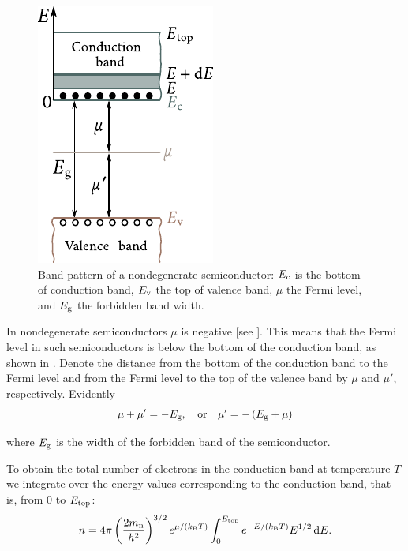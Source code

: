 \begin{figure}[t]
	\begin{center}
		\includegraphics[scale=1]{figures/ch_05/fig_5_17.pdf}
		\caption[]{Band pattern of a nondegenerate semiconductor: $E_{\text{c}}$ is the bottom of conduction band, $E_{\text{v}}$ the top of valence band, $\mu$ the Fermi level, and $E_{\text{g}}$ the forbidden band width.}
		\label{fig:5_17}
	\end{center}
	\vspace{-0.75cm}
\end{figure}

In nondegenerate semiconductors $\mu$ is negative [see ]. This means that the Fermi level in such semiconductors is below the bottom of the conduction band, as shown in . Denote the distance from the bottom of the conduction band to the Fermi level and from the Fermi level to the top of the valence band by $\mu$ and $\mu'$, respectively. Evidently
\begin{equation}\label{eq:5_30}
    \mu+\mu' = -E_{\text{g}},\quad \text{or}\quad \mu'=-\left(E_{\text{g}}+\mu\right)
\end{equation}

\noindent
where $E_{\text{g}}$ is the width of the forbidden band of the semiconductor.

To obtain the total number of electrons in the conduction band at temperature $T$ we integrate  over the energy values corresponding to the conduction band, that is, from $0$ to $E_{\text{top}}$:
\begin{equation*}
    n = 4\pi \left(\frac{2m_{\text{n}}}{h^2}\right)^{3/2} e^{\mu/(k_{\text{B}}T)} \int_0^{E_{\text{top}}} e^{-E/(k_{\text{B}}T)} E^{1/2}\, \mathrm{d} E.
\end{equation*}

